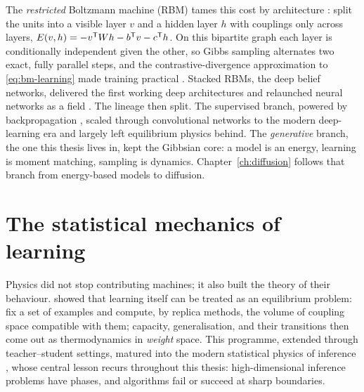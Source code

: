 The \emph{restricted} Boltzmann machine (RBM) tames this cost by
architecture \citep{smolensky1986information}: split the units into a
visible layer $v$ and a hidden layer $h$ with couplings only across
layers, $E(v,h) = -v^{\mathsf{T}} W h - b^{\mathsf{T}} v - c^{\mathsf{T}} h$. On this bipartite graph
each layer is conditionally independent given the other, so Gibbs
sampling alternates two exact, fully parallel steps, and the
contrastive-divergence approximation to \eqref{eq:bm-learning} made
training practical \citep{hinton2002training}. Stacked RBMs, the deep
belief networks, delivered the first working deep architectures and
relaunched neural networks as a field \citep{hinton2006fast}. The lineage
then split. The supervised branch, powered by backpropagation
\citep{rumelhart1986learning}, scaled through convolutional networks to
the modern deep-learning era \citep{krizhevsky2012imagenet,
lecun2015deep} and largely left equilibrium physics behind. The
\emph{generative} branch, the one this thesis lives in, kept the Gibbsian
core: a model is an energy, learning is moment matching, sampling is
dynamics. Chapter~\ref{ch:diffusion} follows that branch from
energy-based models to diffusion.

\section{The statistical mechanics of learning}\label{sec:statmech-learning}

Physics did not stop contributing machines; it also built the theory of
their behaviour. \citet{gardner1988space} showed that learning itself can
be treated as an equilibrium problem: fix a set of examples and compute,
by replica methods, the volume of coupling space compatible with them;
capacity, generalisation, and their transitions then come out as
thermodynamics in \emph{weight} space. This programme, extended through
teacher--student settings, matured into the modern statistical physics of
inference \citep{zdeborova2016statistical}, whose central lesson recurs
throughout this thesis: high-dimensional inference problems have phases,
and algorithms fail or succeed at sharp boundaries.

